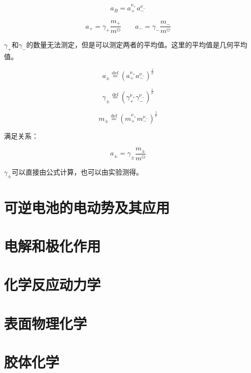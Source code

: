 \documentclass[a4paper]{ctexrep}
\begin{document}
    \[
        a_B = a_+^{\nu_+}a_-^{\nu_-}  
    \]

    \[
        a_+ = \gamma_+ \frac{m_+}{m^\ominus}  \qquad a_- = \gamma_-  \frac{m_-}{m^\ominus}  
    \]

    $\gamma_+$和$\gamma_-$的数量无法测定，但是可以测定两者的平均值。这里的平均值是几何平均值。

    \[
        a_\pm \overset{\mathrm{def}}{=} (a_+^{\nu_+}a_-^{\nu_-})^\frac{1}{\nu} 
    \]

    \[
        \gamma_\pm \overset{\mathrm{def}}{=} (\gamma_+^{\nu_+}\gamma_-^{\nu_-})^\frac{1}{\nu}   
    \]

    \[
        m_\pm \overset{\mathrm{def}}{=} (m_+^{\nu_+}m_-^{\nu_-})^\frac{1}{\nu}   
    \]

    满足关系：

    \[
        a_\pm = \gamma_\pm \frac{m_\pm}{m^\ominus}
    \]

    $\gamma_\pm$可以直接由公式计算，也可以由实验测得。

    \chapter{可逆电池的电动势及其应用}

    \chapter{电解和极化作用}

    \chapter{化学反应动力学}

    \chapter{表面物理化学}

    \chapter{胶体化学}
\end{document}
